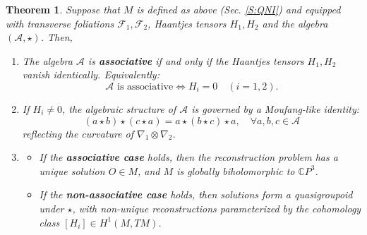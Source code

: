 \documentclass[runningheads]{llncs}
\newtheorem{thm}{Theorem}
\begin{document}
\begin{thm}
Suppose that \( M \) is defined as above (Sec. \ref{S:QNI})  and equipped with transverse foliations \( \mathcal{F}_1, \mathcal{F}_2 \), Haantjes tensors \( H_1, H_2 \) and the algebra $(\mathcal{A} , \star)$. Then,
\begin{enumerate}
    \item The algebra \( \mathcal{A} \) is {\bf associative} if and only if the Haantjes tensors \( H_1, H_2 \) vanish identically. Equivalently:
    \[
    \mathcal{A} \text{ is associative} \iff H_i = 0 \quad (i = 1, 2).
    \]
    \item If \( H_i \neq 0 \), the algebraic structure of \( \mathcal{A} \) is governed by a Moufang-like identity:
    \[
    (a \star b) \star (c \star a) = a \star (b \star c) \star a, \quad \forall a,b,c \in \mathcal{A}
    \]
    reflecting the curvature of \( \nabla_1 \otimes \nabla_2 \).
    \item \begin{itemize} 
    \item If the {\bf associative case} holds, then the reconstruction problem has a unique solution \( O \in M \), and \( M \) is globally biholomorphic to \( \mathbb{C}P^3 \). 
    \item If the {\bf non-associative case} holds, then solutions form a quasigroupoid under \( \star \), with non-unique reconstructions parameterized by the cohomology class \( [H_i] \in H^1(M, TM) \).
    \end{itemize}
\end{enumerate}
\end{thm}
\end{document}
